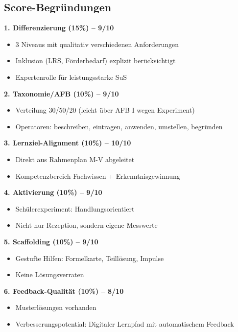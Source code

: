 \documentclass[11pt,a4paper]{article}
\begin{document}
\subsection{Score-Begründungen}

\textbf{1. Differenzierung (15\%) -- 9/10}
\begin{itemize}
    \item 3 Niveaus mit qualitativ verschiedenen Anforderungen
    \item Inklusion (LRS, Förderbedarf) explizit berücksichtigt
    \item Expertenrolle für leistungsstarke SuS
\end{itemize}

\textbf{2. Taxonomie/AFB (10\%) -- 9/10}
\begin{itemize}
    \item Verteilung 30/50/20 (leicht über AFB I wegen Experiment)
    \item Operatoren: beschreiben, eintragen, anwenden, umstellen, begründen
\end{itemize}

\textbf{3. Lernziel-Alignment (10\%) -- 10/10}
\begin{itemize}
    \item Direkt aus Rahmenplan M-V abgeleitet
    \item Kompetenzbereich Fachwissen + Erkenntnisgewinnung
\end{itemize}

\textbf{4. Aktivierung (10\%) -- 9/10}
\begin{itemize}
    \item Schülerexperiment: Handlungsorientiert
    \item Nicht nur Rezeption, sondern eigene Messwerte
\end{itemize}

\textbf{5. Scaffolding (10\%) -- 9/10}
\begin{itemize}
    \item Gestufte Hilfen: Formelkarte, Teillösung, Impulse
    \item Keine Lösungsverraten
\end{itemize}

\textbf{6. Feedback-Qualität (10\%) -- 8/10}
\begin{itemize}
    \item Musterlösungen vorhanden
    \item Verbesserungspotential: Digitaler Lernpfad mit automatischem Feedback
\end{itemize}
\end{document}
